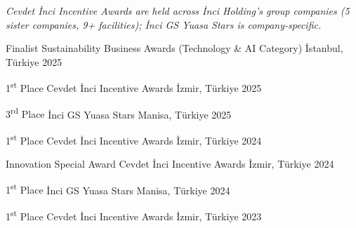 
{\scriptsize\itshape\color{graytext}Cevdet İnci Incentive Awards are held across İnci Holding's group companies (5 sister companies, 9+ facilities); İnci GS Yuasa Stars is company-specific.\par}
\vspace{-1mm}

\begin{cvhonors}

  \cvhonor
    {Finalist} %
    {Sustainability Business Awards (Technology \& AI Category)} %
    {İstanbul, Türkiye} %
    {2025} %

  \cvhonor
    {1\textsuperscript{st} Place} %
    {Cevdet İnci Incentive Awards} %
    {İzmir, Türkiye} %
    {2025} %

  \cvhonor
    {3\textsuperscript{rd} Place} %
    {İnci GS Yuasa Stars} %
    {Manisa, Türkiye} %
    {2025} %

  \cvhonor
    {1\textsuperscript{st} Place} %
    {Cevdet İnci Incentive Awards} %
    {İzmir, Türkiye} %
    {2024} %

  \cvhonor
    {Innovation Special Award} %
    {Cevdet İnci Incentive Awards} %
    {İzmir, Türkiye} %
    {2024} %

  \cvhonor
    {1\textsuperscript{st} Place} %
    {İnci GS Yuasa Stars} %
    {Manisa, Türkiye} %
    {2024} %

  \cvhonor
    {1\textsuperscript{st} Place} %
    {Cevdet İnci Incentive Awards} %
    {İzmir, Türkiye} %
    {2023} %

\end{cvhonors}
